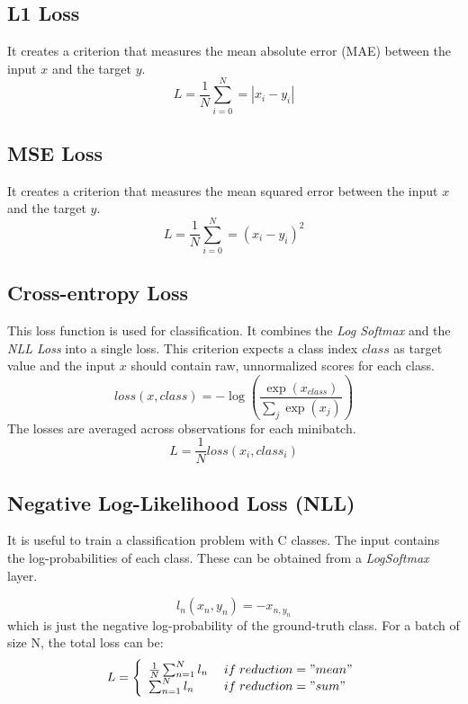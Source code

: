 \subsection{L1 Loss}
It creates a criterion that measures the mean absolute error (MAE) between the input $x$ and the target $y$.
\begin{equation}
    L = \frac{1}{N} \sum_{i=0}^{N} = |x_i - y_i|
\end{equation}

\subsection{MSE Loss}
It creates a criterion that measures the mean squared error between the input $x$ and the target $y$.
\begin{equation}
    L =  \frac{1}{N} \sum_{i=0}^{N} = (x_i - y_i)^2
\end{equation}

\subsection{Cross-entropy Loss}
This loss function is used for classification. It combines the \textit{Log Softmax} and the \textit{NLL Loss} into a single loss. 
This criterion expects a class index $class$ as target value and the input $x$ should contain raw, unnormalized scores for each class.
\begin{equation}
    loss(x, class) = -\log \left(\frac{\exp(x_{class})}{\sum_j \exp(x_j)}\right)
\end{equation}
The losses are averaged across observations for each minibatch.
\begin{equation}
    L = \frac{1}{N} loss(x_i, class_i)
\end{equation}

\subsection{Negative Log-Likelihood Loss (NLL)}
 It is useful to train a classification problem with C classes.
 The input contains the log-probabilities of each class. These can be obtained from a \textit{LogSoftmax} layer.
 
 \begin{equation}
    l_n(x_n, y_n) = -x_{n, y_n} 
 \end{equation}
which is just the negative log-probability of the ground-truth class.
For a batch of size N, the total loss can be:
\begin{equation}
    L = \left\{ \begin{array}{ll}
        \frac{1}{N}\sum_{n=1}^{N} l_n &\;if\;reduction="mean" \\
        \sum_{n=1}^{N} l_n &\;if\;reduction="sum"
    \end{array}\right.
\end{equation}

